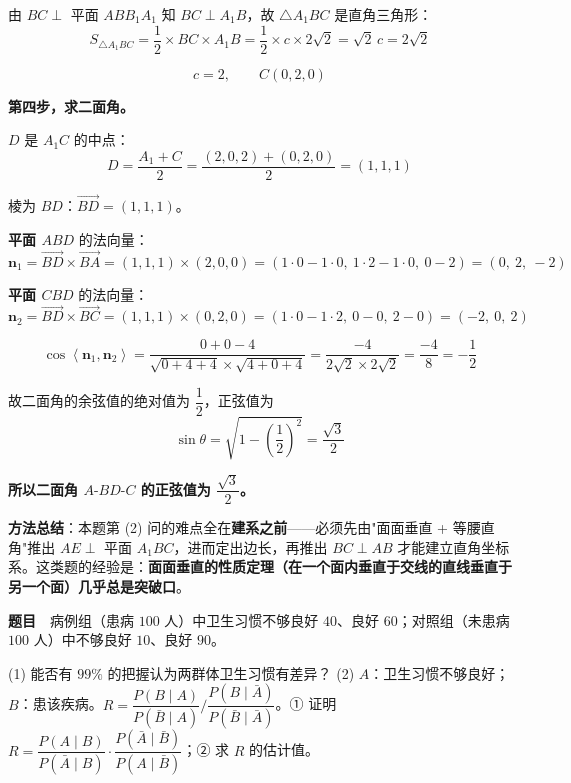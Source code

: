 由 $BC\perp$ 平面 $ABB_1A_1$ 知 $BC\perp A_1B$，故 $\triangle A_1BC$ 是直角三角形：
\[S_{\triangle A_1BC}=\frac12\times BC\times A_1B=\frac12\times c\times2\sqrt2=\sqrt2\,c=2\sqrt2\]

\[c=2,\qquad C(0,2,0)\]

\textbf{第四步，求二面角。}

$D$ 是 $A_1C$ 的中点：
\[D=\frac{A_1+C}2=\frac{(2,0,2)+(0,2,0)}2=(1,1,1)\]

棱为 $BD$：$\overrightarrow{BD}=(1,1,1)$。

\textbf{平面 $ABD$} 的法向量：
\[\boldsymbol n_1=\overrightarrow{BD}\times\overrightarrow{BA}=(1,1,1)\times(2,0,0)=(1\cdot0-1\cdot0,\ 1\cdot2-1\cdot0,\ 0-2)=(0,\ 2,\ -2)\]

\textbf{平面 $CBD$} 的法向量：
\[\boldsymbol n_2=\overrightarrow{BD}\times\overrightarrow{BC}=(1,1,1)\times(0,2,0)=(1\cdot0-1\cdot2,\ 0-0,\ 2-0)=(-2,\ 0,\ 2)\]

\[\cos\left\langle\boldsymbol n_1,\boldsymbol n_2\right\rangle=\frac{0+0-4}{\sqrt{0+4+4}\times\sqrt{4+0+4}}=\frac{-4}{2\sqrt2\times2\sqrt2}=\frac{-4}8=-\frac12\]

故二面角的余弦值的绝对值为 $\dfrac12$，正弦值为
\[\sin\theta=\sqrt{1-\left(\frac12\right)^{2}}=\frac{\sqrt3}2\]

\textbf{所以二面角 $A\text{-}BD\text{-}C$ 的正弦值为 $\dfrac{\sqrt3}2$。}

\begin{gktip}
\textbf{方法总结}：本题第 (2) 问的难点全在\textbf{建系之前}——必须先由"面面垂直 + 等腰直角"推出 $AE\perp$ 平面 $A_1BC$，进而定出边长，再推出 $BC\perp AB$ 才能建立直角坐标系。这类题的经验是：\textbf{面面垂直的性质定理（在一个面内垂直于交线的直线垂直于另一个面）几乎总是突破口}。
\end{gktip}

\par\medskip


\textbf{题目}　病例组（患病 $100$ 人）中卫生习惯不够良好 $40$、良好 $60$；对照组（未患病 $100$ 人）中不够良好 $10$、良好 $90$。

  (1) 能否有 $99\%$ 的把握认为两群体卫生习惯有差异？
  (2) $A$：卫生习惯不够良好；$B$：患该疾病。$R=\dfrac{P(B\mid A)}{P(\bar B\mid A)}\Big/\dfrac{P(B\mid\bar A)}{P(\bar B\mid\bar A)}$。① 证明 $R=\dfrac{P(A\mid B)}{P(\bar A\mid B)}\cdot\dfrac{P(\bar A\mid\bar B)}{P(A\mid\bar B)}$；② 求 $R$ 的估计值。

\par\medskip

